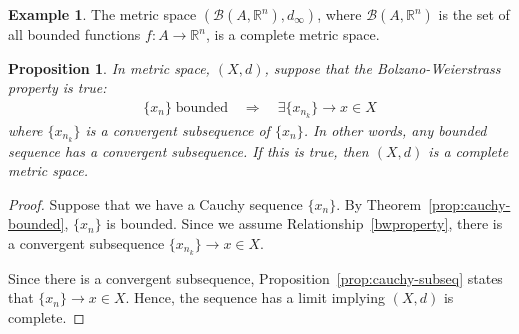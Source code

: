 \documentclass[12pt]{article}
\numberwithin{equation}{section} %
\theoremstyle{plain}
\newtheorem{prop}[thm]{Proposition}
\theoremstyle{definition}
\newtheorem{ex}[thm]{Example}
\theoremstyle{remark}
\newcommand{\R}{\mathbb{R}}
\begin{document}
\begin{ex}
The metric space $\left(\mathscr{B}(A,\R^n), d_\infty\right)$,
where $\mathscr{B}(A,\R^n)$ is the set of all bounded functions
$f:A\rightarrow \R^n$, is a complete metric space.
\end{ex}

\begin{prop}
\label{prop:bwproperty}
In metric space, $(X,d)$,
suppose that the \emph{Bolzano-Weierstrass} property is true:
\begin{align}
  \label{bwproperty}
  \{x_n\} \;\text{bounded}
  \quad\Rightarrow\quad
  \exists \{x_{n_k}\}\rightarrow x \in X
\end{align}
where $\{x_{n_k}\}$ is a convergent subsequence of $\{x_n\}$.  In other
words, any bounded sequence has a convergent subsequence. If this is
true, then $(X,d)$ is a complete metric space.
\end{prop}
\begin{proof}
Suppose that we have a Cauchy sequence $\{x_n\}$. By
Theorem~\ref{prop:cauchy-bounded}, $\{x_n\}$ is bounded. Since we assume
Relationship~\ref{bwproperty}, there is a convergent subsequence
$\{x_{n_k}\}\rightarrow x \in X$.

Since there is a convergent subsequence,
Proposition~\ref{prop:cauchy-subseq} states that $\{x_n\}\rightarrow
x\in X$. Hence, the sequence has a limit implying $(X,d)$ is complete.
\end{proof}
\end{document}
